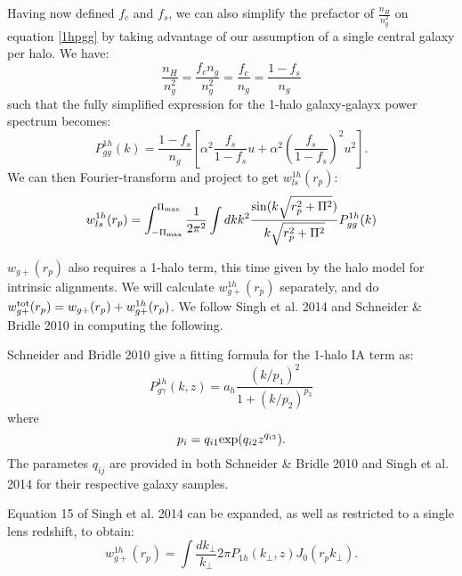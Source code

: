 \documentclass[onecolumn,amsmath,aps,fleqn, superscriptaddress]{revtex4}
\begin{document}
Having now defined $f_c$ and $f_s$, we can also simplify the prefactor of $\frac{n_H}{n_g^2}$ on equation \ref{1hpgg} by taking advantage of our assumption of a single central galaxy per halo. We have:
\begin{equation}
\frac{n_H}{n_g^2} = \frac{f_c n_g}{n_g^2} = \frac{f_c}{n_g} = \frac{1- f_s}{n_g}
\label{prefac1hpgg}
\end{equation}
such that the fully simplified expression for the 1-halo galaxy-galayx power spectrum becomes:
\begin{equation}
P_{gg}^{1h}(k) = \frac{1-f_s}{n_g}\left[\alpha^2 \frac{f_s}{1-f_s} u + \alpha^2 \left(\frac{f_s}{1-f_s}\right)^2 u^2\right].
\label{1hpgg_fs}
\end{equation}
We can then Fourier-transform and project to get $w_{ls}^{1h}(r_p)$:
\begin{equation}
w_{ls}^{1h}(r_p) = \int_{-\Pi_{\rm max}}^{\Pi_{\rm max}} \frac{1}{2\pi^2} \int dk k^2 \frac{\sin(k\sqrt{r_p^2 + \Pi^2})}{k\sqrt{r_p^2 + \Pi^2}} P_{gg}^{1h}(k)
\label{wl1h}
\end{equation}

$w_{g+}(r_p)$ also requires a 1-halo term, this time given by the halo model for intrinsic alignments. We will calculate $w_{g+}^{1h}(r_p)$ separately, and do $w_{g+}^{\rm tot}(r_p) = w_{g+}(r_p) + w_{g+}^{1h}(r_p)$. We follow Singh et al. 2014 and Schneider \& Bridle 2010 in computing the following.

Schneider and Bridle 2010 give a fitting formula for the 1-halo IA term as:
\begin{equation}
P^{1h}_{g\gamma}(k,z) = a_h \frac{(k/p_1)^2}{1+ (k/p_2)^{p_3}}
\label{P1hIA}
\end{equation}
where
\begin{equation}
p_i = q_{i1} {\rm exp}(q_{i2} z^{q_{i3}}).
\label{pi}
\end{equation}
The parametes $q_{ij}$ are provided in both Schneider \& Bridle 2010 and Singh et al. 2014 for their respective galaxy samples.

Equation 15 of Singh et al. 2014 can be expanded, as well as restricted to a single lens redshift, to obtain:
\begin{equation}
w_{g+}^{1h}(r_p) = \int \frac{dk_\perp}{k_\perp}{2\pi} P_{1h}(k_\perp,z) J_0(r_p k_\perp).
\label{wg1h}
\end{equation}
\end{document}
